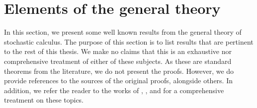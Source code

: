 \section{Elements of the general theory}
\label{sec:elementsgeneraltheory}
In this section, we present some well known results from the general theory of stochastic calculus. The purpose of this section is to list results that are pertinent to the rest of this thesis. We make no claims that this is an exhaustive nor comprehensive treatment of either of these subjects. As these are standard theorems from the literature, we do not present the proofs. However, we do provide references to the sources of the original proofs, alongside others. In addition, we refer the reader to the works of \citet{klebaner}, \citet{shreve2004stochastic}, \citet{rogers2000diffusions} and \citet{cherny2005singular} for a comprehensive treatment on these topics. 
